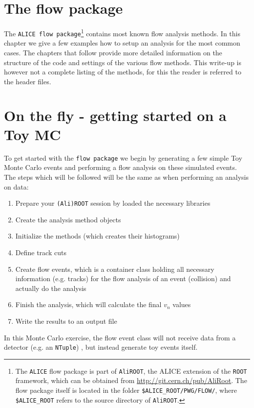 \documentclass[a4paper]{book}
\numberwithin{equation}{subsection}
\begin{document}
\section{The flow package}
\label{quickstart}
The \texttt{ALICE flow package}\footnote{The \texttt{ALICE} flow package is part of \texttt{AliROOT}, the ALICE extension of the \texttt{ROOT} framework, which can be obtained from \href{http://git.cern.ch/pub/AliRoot}{http://git.cern.ch/pub/AliRoot}. The flow package itself is located in the folder \texttt{\$ALICE\_ROOT/PWG/FLOW/}, where \texttt{\$ALICE\_ROOT} refers to the source directory of \texttt{AliROOT}.} 
contains most known flow analysis methods.  In this chapter we give a few examples how to setup an
analysis for the most common cases. The chapters that follow provide more detailed information on the structure of the code 
and settings of the various flow methods. 
This write-up is however not a complete listing of the methods, for this the reader is referred to the header files.
 
\section{On the fly - getting started on a Toy MC}
To get started with the \texttt{flow package} we begin by generating a few simple Toy Monte Carlo events and performing a flow analysis on these simulated events. The steps which will be followed will be the same as when performing an analysis on data: 
\begin{enumerate}
\item Prepare your \texttt{(Ali)ROOT} session by loaded the necessary libraries
\item Create the analysis method objects
\item Initialize the methods (which creates their histograms)
\item Define track cuts
\item Create flow events, which is a container class holding all necessary information (e.g. tracks) for the flow analysis of an event (collision) and actually do the analysis
\item Finish the analysis, which will calculate the final $v_n$ values
\item Write the results to an output file
\end{enumerate}
In this Monte Carlo exercise, the flow event class will not receive data from a detector (e.g. an \texttt{NTuple}) , but instead generate toy events itself. 
\end{document}
